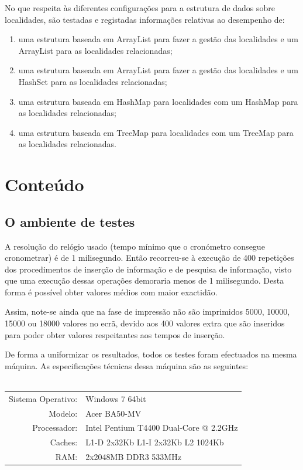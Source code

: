 \documentclass[a5paper,twocolumn, 11pt]{article}
\begin{document}
No que respeita às diferentes configurações para a estrutura de dados sobre localidades, são testadas e registadas informações relativas ao desempenho de:
\begin{enumerate}
    \item{uma estrutura baseada em ArrayList para fazer a gestão das localidades e um ArrayList para as localidades relacionadas;}
    \item{uma estrutura baseada em ArrayList para fazer a gestão das localidades e um HashSet para as localidades relacionadas;}
    \item{uma estrutura baseada em HashMap para localidades com um HashMap
para as localidades relacionadas;}
    \item{uma estrutura baseada em TreeMap para localidades com um TreeMap
para as localidades relacionadas.}
\end{enumerate}
\clearpage
\newpage
\section{Conteúdo}
\subsection{O ambiente de testes}

A resolução do relógio usado (tempo mínimo que o cronómetro consegue cronometrar) é de 1 milisegundo. Então recorreu-se à execução de 400 repetições dos procedimentos de inserção de informação e de pesquisa de informação, visto que uma execução dessas operações demoraria menos de 1 milisegundo. Desta forma é possível obter valores médios com maior exactidão.

Assim, note-se ainda que na fase de impressão não são imprimidos 5000, 10000, 15000 ou 18000 valores no ecrã, devido aos 400 valores extra que são inseridos para poder obter valores respeitantes aos tempos de inserção.

De forma a uniformizar os resultados, todos os testes foram efectuados na mesma máquina. As especificações técnicas dessa máquina são as seguintes:\\
\\
\begin{tabular}{ | r  | p{2.8cm} | }
    \hline
    Sistema Operativo: & Windows 7 64bit \\
    Modelo: & Acer BA50-MV \\
    Processador: & \vbox{Intel Pentium} T4400 \vbox{Dual-Core} @ 2.2GHz \\
    Caches: & \vbox{L1-D 2x32Kb}
    \vbox{L1-I 2x32Kb}
    \vbox{L2 1024Kb} \\
    RAM: & 2x2048MB DDR3 533MHz\\ \hline
\end{tabular}\\
\\
\end{document}
